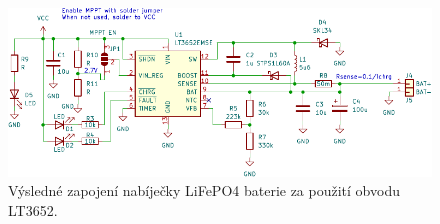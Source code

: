\begin{figure}
    \centering
    \includegraphics[width=\textwidth]{obrazky/batteryCharger_schematic.pdf}
    \caption{Výsledné zapojení nabíječky LiFePO4 baterie za použití obvodu LT3652.}
    \label{fig_ChargerSchematic}
\end{figure}



